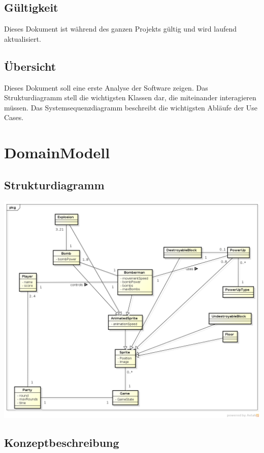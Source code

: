 \documentclass[11pt]{scrartcl}
\begin{document}
\subsection{Gültigkeit}
\label{sec:Gültigkeit}
Dieses Dokument ist während des ganzen Projekts gültig und wird laufend aktualisiert.

\subsection{Übersicht}
\label{sec:Übersicht}
Dieses Dokument soll eine erste Analyse der Software zeigen. Das Strukturdiagramm stell die wichtigsten Klassen dar, die miteinander interagieren müssen. Das Systemsequenzdiagramm beschreibt die wichtigsten Abläufe der Use Cases.

\newpage
\section{DomainModell}
\label{sec:DomainModell}
\subsection{Strukturdiagramm}
\label{sec:Strukturdiagramm}

\begin{center}
\includegraphics[scale=0.5]{Strukturdiagramm_JBomberman} 
\end{center}

\newpage

\subsection{Konzeptbeschreibung}
\label{sec:Konzeptbeschreibung}
\end{document}
